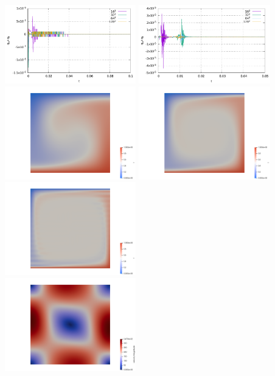 \begin{center}
\includegraphics[width=5.7cm]{python_codes/fieldstone_110/results_BA/aspect/qsum_1e5}
\includegraphics[width=5.7cm]{python_codes/fieldstone_110/results_BA/aspect/qsum_1e6}\\
\includegraphics[width=5.7cm]{python_codes/fieldstone_110/results_BA/aspect/T_Ra1e4}
\includegraphics[width=5.7cm]{python_codes/fieldstone_110/results_BA/aspect/T_Ra1e5}
\includegraphics[width=5.7cm]{python_codes/fieldstone_110/results_BA/aspect/T_Ra1e6}\\
\includegraphics[width=5.7cm]{python_codes/fieldstone_110/results_BA/aspect/vel_Ra1e4}

\end{center}
